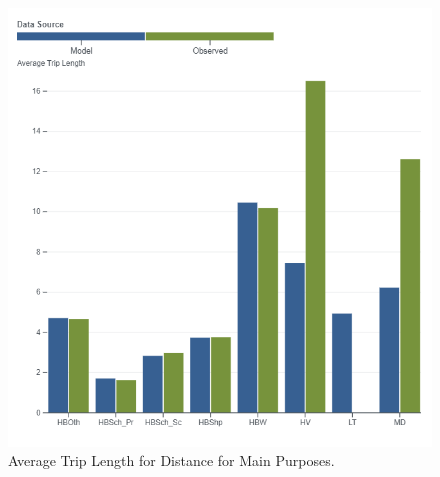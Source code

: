 \documentclass[
  letterpaper,
  DIV=11,
  numbers=noendperiod]{scrreprt}
\begin{document}
\begin{figure}[H]

{\centering \includegraphics[width=\textwidth,height=0.4\textheight]{v9x/v900/validation/_pictures/5-plot4.png}

}

\caption{\label{fig-pdf-dist-purp}Average Trip Length for Distance for
Main Purposes.}

\end{figure}
\end{document}
